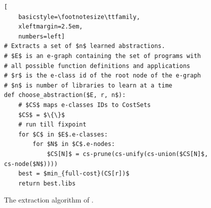 \begin{figure}
\begin{lstlisting}[
    basicstyle=\footnotesize\ttfamily,
    xleftmargin=2.5em,
    numbers=left]
# Extracts a set of $n$ learned abstractions.
# $E$ is an e-graph containing the set of programs with
# all possible function definitions and applications
# $r$ is the e-class id of the root node of the e-graph
# $n$ is number of libraries to learn at a time
def choose_abstraction($E, r, n$):
    # $CS$ maps e-classes IDs to CostSets
    $CS$ = $\{\}$
    # run till fixpoint
    for $C$ in $E$.e-classes:
        for $N$ in $C$.e-nodes:
            $CS[N]$ = cs-prune(cs-unify(cs-union($CS[N]$, cs-node($N$))))
    best = $min_{full-cost}(CS[r])$
    return best.libs

\end{lstlisting}
\caption{The extraction algorithm of \babble.}
\label{fig:algo-extract}
\end{figure}

